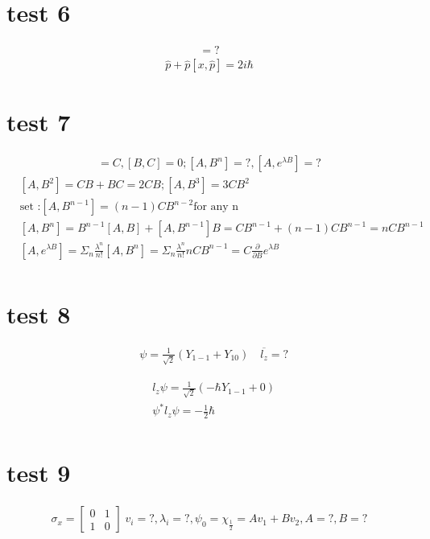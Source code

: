 \documentclass{article}
\begin{document}
 \section{test 6}
 \begin{align*}
   [x,\hat p^2]=?
 \end{align*}
 \begin{align*}
   [x,\hat p]\hat p+\hat p[x,\hat p]=2i\hbar
 \end{align*}


 \section{test 7}
 \begin{align*}
   [A,B]=C,[B,C]=0;[A,B^n]=?,[A,e^{\lambda B}]=?
 \end{align*}
 \begin{align*}
  & [A,B^2]=CB+BC=2CB;[A,B^3]=3CB^2\\
  &\text{set :} [A,B^{n-1}]=(n-1)CB^{n-2}\text{for any n}\\
  & [A,B^n]=B^{n-1}[A,B]+[A,B^{n-1}]B=CB^{n-1}+ (n-1)CB^{n-1}=nCB^{n-1} \\
  & [A,e^{\lambda B}]=\Sigma_n\frac{\lambda^n }{n!}[A,B^n]=\Sigma_n \frac{\lambda^n}{n!}nCB^{n-1}=C\frac{ \partial }{ \partial B}e^{\lambda B} \\
 \end{align*}

 \section{test 8}

 \begin{align*}
  & \psi=\frac1{\sqrt{2}}(Y_{1-1}+Y_{10})\quad \overline 
  {l_z} =?
 \end{align*}

 \begin{align*}
  & l_z\psi=\frac1{\sqrt{2}}(-\hbar Y_{1-1}+0) \\
  &\psi^* l_z \psi =-\frac12 \hbar\\
 \end{align*}

 \section{test 9}
 \begin{align*}
   \sigma_x=\begin{bmatrix}0&1\\1&0\end{bmatrix}\; v_i=?,\lambda_i=?,\psi_0=\chi_{\frac12}=Av_1+Bv_2,A=?,B=?
 \end{align*}
\end{document}
